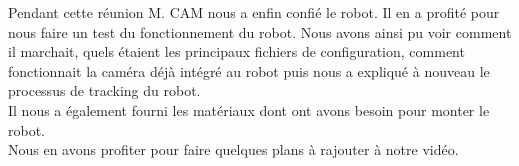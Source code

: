 \documentclass{PackagerQualityN}
\begin{document}
Pendant cette réunion M. CAM nous a enfin confié le robot. Il en a profité pour nous faire un test du fonctionnement du robot. Nous avons ainsi pu voir comment il marchait, quels étaient les principaux fichiers de configuration, comment fonctionnait la caméra déjà intégré au robot puis nous a expliqué à nouveau le processus de tracking du robot.
\\

Il nous a également fourni les matériaux dont ont avons besoin pour monter le robot.
\\

Nous en avons profiter pour faire quelques plans à rajouter à notre vidéo.

\newp       %

\listoffigures

\newp



\end{document}
